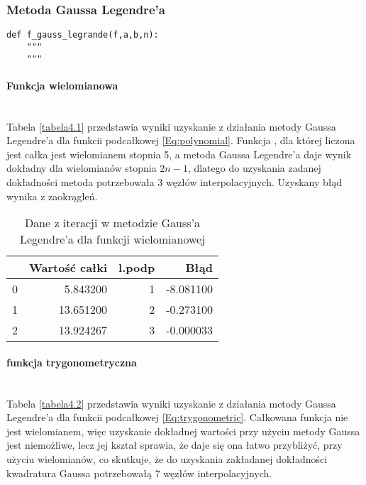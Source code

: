 \documentclass[12pt,twoside]{article}
\begin{document}
\subsubsection{Metoda Gaussa Legendre'a}

\begin{lstlisting}[caption={Kod w języku python implementujący metodę trapezów}]
def f_gauss_legrande(f,a,b,n):
    """
    """
\end{lstlisting}
\label{Listing 9}

\paragraph{Funkcja wielomianowa}\mbox{} \\

Tabela \eqref{tabela4.1} przedstawia wyniki uzyskanie z działania metody Gaussa Legendre'a dla funkcii podcałkowej \eqref{Eq:polynomial}. Funkcja , dla której liczona jest całka jest wielomianem stopnia 5, a metoda Gaussa Legendre'a daje wynik dokładny dla wielomianów stopnia $2n-1$, dlatego do uzyskania zadanej dokładności metoda potrzebowała 3 węzłów interpolacyjnych. Uzyskany błąd wynika z zaokrągleń.

\begin{table}[H]
\centering 
\caption{Dane z iteracji w metodzie Gauss'a Legendre'a dla funkcji wielomianowej}
\label{tabela4.1}
\begin{tabular}{lrrr}
\toprule
{} &  Wartość całki &  l.podp &      Błąd \\
\midrule
0 &       5.843200 &       1 & -8.081100 \\
1 &      13.651200 &       2 & -0.273100 \\
2 &      13.924267 &       3 & -0.000033 \\
\bottomrule
\end{tabular}
\end{table}

\paragraph{funkcja trygonometryczna}\mbox{} \\

Tabela \eqref{tabela4.2} przedstawia wyniki uzyskanie z działania metody Gaussa Legendre'a dla funkcii podcałkowej \eqref{Eq:trygonometric}. Całkowana funkcja nie jest wielomianem, więc uzyskanie dokładnej wartości przy użyciu metody Gaussa jest niemożliwe, lecz jej kształ sprawia, że daje się ona łatwo przybliżyć, przy użyciu wielomianów, co skutkuje, że do uzyskania zakładanej dokładności kwadratura Gaussa potrzebowałą 7 węzłów interpolacyjnych.
\end{document}
